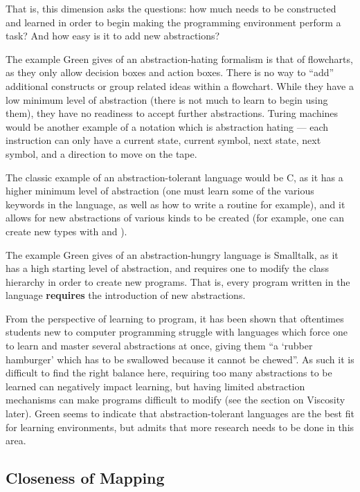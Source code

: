 That is, this dimension asks the questions: how much needs to be constructed and learned in order to begin making the programming
environment perform a task?  And how easy is it to add new abstractions?  

The example Green gives of an abstraction-hating formalism is that of flowcharts, as they only allow decision boxes 
and action boxes.  There is no way to ``add'' additional constructs or group related ideas within a flowchart.  While they 
have a low minimum level of abstraction (there is not much to learn to begin using them), they have no readiness to accept
further abstractions.  Turing 
machines would be another example of a notation which is abstraction hating --- each instruction can only have a current 
state, current symbol, next state, next symbol, and a direction to move on the tape.

The classic example of an abstraction-tolerant language would be C, as it has a higher minimum level of abstraction (one must
learn some of the various keywords in the language, as well as how to write a  routine for example), and it allows
for new abstractions of various kinds to be created (for example, one can create new types with  and ).

The example Green gives of an abstraction-hungry language is Smalltalk, as it has a high starting level of abstraction, 
and requires one to modify the class hierarchy in order to create new programs.  That is, every program written in the
language \textbf{requires} the introduction of new abstractions.

From the perspective of learning to program, it has been shown that oftentimes
students new to computer programming struggle with languages which force one to learn and master several 
abstractions at once, giving them ``a `rubber hamburger' which has to be swallowed because it cannot be chewed''\cite{green96}.
As such it is difficult to find the right balance here, requiring too many abstractions to be learned can negatively
impact learning, but having limited abstraction mechanisms can make programs difficult to modify (see the section on Viscosity
later).  Green seems to indicate that abstraction-tolerant languages are the best fit for learning environments, but admits
that more research needs to be done in this area.

\subsection{Closeness of Mapping}
\label{closenessoutline}

